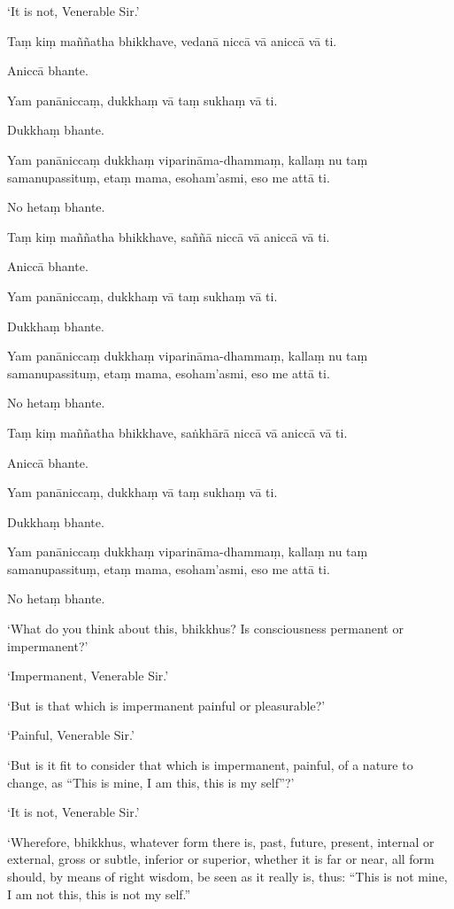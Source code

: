 ‘It is not, Venerable Sir.’

\clearpage

\paliText
\markboth{\paliTitle}{\rightmark}

Taṃ kiṃ maññatha bhikkhave, vedanā niccā vā aniccā vā ti.

Aniccā bhante.

Yam panāniccaṃ, dukkhaṃ vā taṃ sukhaṃ vā ti.

Dukkhaṃ bhante.

Yam panāniccaṃ dukkhaṃ viparināma-dhammaṃ, kallaṃ nu taṃ samanupassituṃ,
etaṃ mama, esoham'asmi, eso me attā ti.

No hetaṃ bhante.

Taṃ kiṃ maññatha bhikkhave, saññā niccā vā aniccā vā ti.

Aniccā bhante.

Yam panāniccaṃ, dukkhaṃ vā taṃ sukhaṃ vā ti.

Dukkhaṃ bhante.

Yam panāniccaṃ dukkhaṃ viparināma-dhammaṃ, kallaṃ nu taṃ samanupassituṃ,
etaṃ mama, esoham'asmi, eso me attā ti.

No hetaṃ bhante.

Taṃ kiṃ maññatha bhikkhave, saṅkhārā niccā vā aniccā vā ti.

Aniccā bhante.

Yam panāniccaṃ, dukkhaṃ vā taṃ sukhaṃ vā ti.

Dukkhaṃ bhante.

Yam panāniccaṃ dukkhaṃ viparināma-dhammaṃ, kallaṃ nu taṃ samanupassituṃ,
etaṃ mama, esoham'asmi, eso me attā ti.

No hetaṃ bhante.

\clearpage

\englishText
\markboth{\englishTitle}{\rightmark}

‘What do you think about this, bhikkhus? Is consciousness permanent or
impermanent?’

‘Impermanent, Venerable Sir.’

‘But is that which is impermanent painful or pleasurable?’

‘Painful, Venerable Sir.’

‘But is it fit to consider that which is impermanent, painful, of a
nature to change, as “This is mine, I am this, this is my self”?’

‘It is not, Venerable Sir.’

‘Wherefore, bhikkhus, whatever form there is, past, future, present,
internal or external, gross or subtle, inferior or superior, whether it
is far or near, all form should, by means of right wisdom, be seen as it
really is, thus: “This is not mine, I am not this, this is not my self.”

